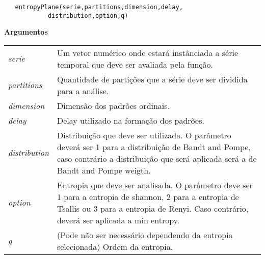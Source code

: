 \documentclass[12pt,letterpaper]{article}
\begin{document}
\begin{lstlisting}
   entropyPlane(serie,partitions,dimension,delay,
   			distribution,option,q)
\end{lstlisting}

\vspace{0.5cm}

\textbf{Argumentos}

\begin{table}[!h]
\begin{center}
\begin{tabularx}{\textwidth}{X X}
\hspace{0.5cm} \textit{serie} \vspace{0.5cm}& Um vetor numérico onde estará instânciada a série temporal que deve ser avaliada pela função.\vspace{0.5cm}\\
\hspace{0.5cm} \textit{partitions} \vspace{0.5cm}& Quantidade de partições que a série deve ser dividida para a análise.\vspace{0.5cm}\\
\hspace{0.5cm} \textit{dimension} \vspace{0.5cm}& Dimensão dos padrões ordinais.\vspace{0.5cm}\\
\hspace{0.5cm} \textit{delay} \vspace{0.5cm}& Delay utilizado na formação dos padrões.\vspace{0.5cm}\\
\hspace{0.5cm} \textit{distribution} \vspace{0.5cm}& Distribuição que deve ser utilizada. O parâmetro deverá ser 1 para a distribuição de Bandt and Pompe, caso contrário a distribuição que será aplicada será a de Bandt and Pompe weigth.\vspace{0.5cm}\\
\hspace{0.5cm} \textit{option} \vspace{0.5cm}& Entropia que deve ser analisada. O parâmetro deve ser 1 para a entropia de shannon, 2 para a entropia de Tsallis ou 3 para a entropia de Renyi. Caso contrário, deverá ser aplicada a min entropy.\vspace{0.5cm}\\
\hspace{0.5cm} \textit{q} \vspace{0.5cm}& (Pode não ser necessário dependendo da entropia selecionada) Ordem da entropia.\vspace{0.5cm}\\
\end{tabularx}
\end{center}
\end{table} 
\end{document}
